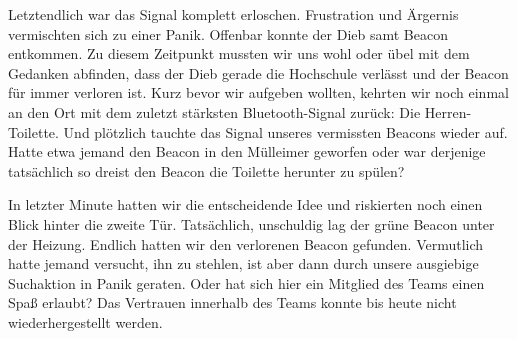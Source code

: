 Letztendlich war das Signal komplett erloschen. Frustration und Ärgernis vermischten 
sich zu einer Panik. Offenbar konnte der Dieb samt Beacon entkommen. Zu diesem Zeitpunkt
mussten wir uns wohl oder übel mit dem Gedanken abfinden, dass der Dieb gerade die Hochschule
verlässt und der Beacon für immer verloren ist. Kurz bevor wir aufgeben wollten,
kehrten wir noch einmal an den Ort mit dem zuletzt stärksten Bluetooth-Signal zurück:
Die Herren-Toilette. Und plötzlich tauchte das Signal unseres vermissten Beacons wieder
auf. Hatte etwa jemand den Beacon in den Mülleimer geworfen oder war derjenige tatsächlich
so dreist den Beacon die Toilette herunter zu spülen?

In letzter Minute hatten wir die entscheidende Idee und riskierten noch einen Blick hinter 
die zweite Tür. Tatsächlich, unschuldig lag der grüne Beacon unter der Heizung. Endlich 
hatten wir den verlorenen Beacon gefunden. Vermutlich hatte jemand versucht, ihn zu stehlen, 
ist aber dann durch unsere ausgiebige Suchaktion in Panik geraten. Oder hat sich hier ein 
Mitglied des Teams einen Spaß erlaubt? Das Vertrauen innerhalb des Teams konnte bis heute nicht
wiederhergestellt werden.

